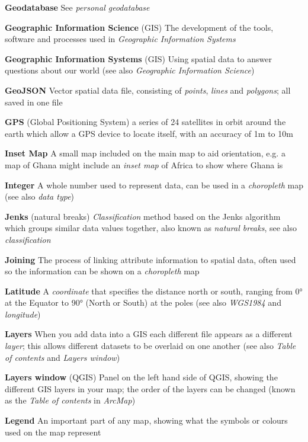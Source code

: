\documentclass[a4paper,10pt]{article}
\begin{document}
\begin{multicols}{2}
\textbf{Geodatabase} See \textit{personal geodatabase}

\textbf{Geographic Information Science} (GIS) The development of the tools, software and processes used in \textit{Geographic Information Systems} 

\textbf{Geographic Information Systems} (GIS) Using spatial data to answer questions about our world (see also \textit{Geographic Information Science})

\textbf{GeoJSON} Vector spatial data file, consisting of \textit{points}, \textit{lines} and \textit{polygons}; all saved in one file

\textbf{GPS} (Global Positioning System) a series of 24 satellites in orbit around the earth which allow a GPS device to locate itself, with an accuracy of 1m to 10m

\textbf{Inset Map} A small map included on the main map to aid orientation, e.g. a map of Ghana might include an \textit{inset map} of Africa to show where Ghana is

\textbf{Integer} A whole number used to represent data, can be used in a \textit{choropleth} map (see also \textit{data type}) 

\textbf{Jenks} (natural breaks) \textit{Classification} method based on the Jenks algorithm which groups similar data values together, also known as \textit{natural breaks}, see also \textit{classification}

\textbf{Joining} The process of linking attribute information to spatial data, often used so the information can be shown on a \textit{choropleth} map 

\textbf{Latitude} A \textit{coordinate} that specifies the distance north or south, ranging from \ang{0} at the Equator to \ang{90} (North or South) at the poles (see also \textit{WGS1984} and \textit {longitude})

\textbf{Layers} When you add data into a GIS each different file appears as a different \textit{layer}; this allows different datasets to be overlaid on one another (see also \textit{Table of contents} and \textit{Layers window})

\textbf{Layers window} (QGIS) Panel on the left hand side of QGIS, showing the different GIS layers in your map; the order of the layers can be changed (known as the \textit{Table of contents} in \textit{ArcMap})

\textbf{Legend} An important part of any map, showing what the symbols or colours used on the map represent 


\end{multicols}
\end{document}
